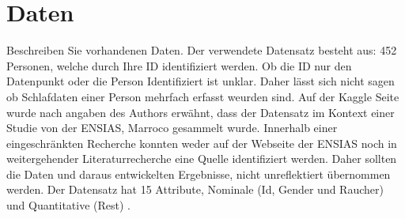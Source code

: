 \documentclass[usegeometry=true]{scrartcl}
\begin{document}
\section{Daten}
Beschreiben Sie vorhandenen Daten. 
Der verwendete Datensatz besteht aus: 452 Personen, welche durch Ihre ID identifiziert werden. Ob die ID nur den Datenpunkt oder die Person Identifiziert ist unklar. Daher lässt sich nicht sagen ob Schlafdaten einer Person mehrfach erfasst weurden sind. 
Auf der Kaggle Seite wurde nach angaben des Authors erwähnt, dass der Datensatz im Kontext einer Studie von der ENSIAS, Marroco gesammelt wurde.
Innerhalb einer eingeschränkten Recherche konnten weder auf der Webseite der ENSIAS noch in weitergehender Literaturrecherche eine Quelle identifiziert werden. Daher sollten die Daten und daraus entwickelten Ergebnisse, nicht unreflektiert übernommen werden. 
Der Datensatz hat 15 Attribute, Nominale (Id, Gender und Raucher) und Quantitative (Rest) .\\
\end{document}
